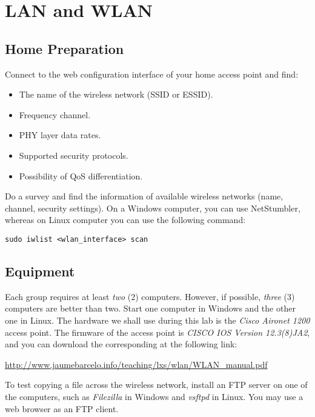\chapter{LAN and WLAN}

\section{Home Preparation}

Connect to the web configuration interface of your home access point and find:
\begin{itemize}
\item The name of the wireless network (SSID or ESSID).
\item Frequency channel.
\item PHY layer data rates.
\item Supported security protocols.
\item Possibility of QoS differentiation.
\end{itemize}

Do a survey and find the information of available wireless networks (name, channel, security settings). On a Windows computer, you can use NetStumbler, whereas on Linux computer you can use the following command:

\begin{lstlisting}
sudo iwlist <wlan_interface> scan
\end{lstlisting}

\section{Equipment}

Each group requires at least \emph{two} (2) computers. However, if possible, \emph{three} (3) computers are better than two. Start one computer in Windows and the other one in Linux. The hardware we shall use during this lab is the \emph{Cisco Aironet 1200} access point. The firmware of the access point is \emph{CISCO IOS Version 12.3(8)JA2}, and you can download the corresponding at the following link:

\url{http://www.jaumebarcelo.info/teaching/lxs/wlan/WLAN_manual.pdf}

To test copying a file across the wireless network, install an FTP server on one of the computers, such as \emph{Filezilla} in Windows and \emph{vsftpd} in Linux. You may use a web browser as an FTP client.

